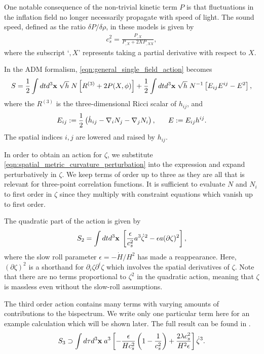 One notable consequence of the non-trivial kinetic term $P$ is that fluctuations in the inflation field no longer necessarily propagate with speed of light. The sound speed, defined as the ratio $\delta P / \delta \rho$, in these models is given by
\begin{align}
	c_s^2 = \frac{P_{,X}}{P_{,X} + 2 X P_{,XX}}, \label{eqn:general_single_field_sound_speed}
\end{align}
where the subscript `$,X$' represents taking a partial derivative with respect to $X$.

In the ADM formalism, \eqref{eqn:general_single_field_action} becomes
\begin{align}
	S = \frac{1}{2}\int dt d^3 \mathbf{x} \; \sqrt{h} \; N \left[ R^{(3)} + 2P(X,\phi) \right] + \frac{1}{2} \int dt d^3 \mathbf{x} \; \sqrt{h} \; N^{-1} \left[ E_{ij} E^{ij} - E^2 \right],
\end{align}
where the $R^{(3)}$ is the three-dimensional Ricci scalar of $h_{ij}$, and
\begin{align}
	E_{ij} := \frac{1}{2} \left( \dot{h}_{ij} - \nabla_i N_j - \nabla_j N_i \right), \hspace{0.05\textwidth}
	E := E_{ij} h^{ij}.
\end{align}
The spatial indices $i,j$ are lowered and raised by $h_{ij}$.

In order to obtain an action for $\zeta$, we substitute \eqref{eqn:spatial_metric_curvature_perturbation} into the expression and expand perturbatively in $\zeta$. We keep terms of order up to three as they are all that is relevant for three-point correlation functions. It is sufficient to evaluate $N$ and $N_i$ to first order in $\zeta$ since they multiply with constraint equations which vanish up to first order.

The quadratic part of the action is given by
\begin{align}
	S_2 = \int dt d^3\mathbf{x} \; \left[ \frac{\epsilon}{c_s^2} a^3 \dot{\zeta}^2 - \epsilon a(\partial\zeta)^2  \right], \label{eqn:quadratic_action_in_zeta}
\end{align}
where the slow roll parameter $\epsilon=-\dot{H}/H^2$ has made a reappearance. Here, $(\partial\zeta)^2$ is a shorthand for $\partial_i \zeta \partial^i \zeta$ which involves the spatial derivatives of $\zeta$. Note that there are no terms proportional to $\zeta^2$ in the quadratic action, meaning that $\zeta$ is massless even without the slow-roll assumptions.

The third order action contains many terms with varying amounts of contributions to the bispectrum. We write only one particular term here for an example calculation which will be shown later. The full result can be found in \cite{Chen2007b}. 
\begin{align}
	S_3 \supset \int d\tau d^3\mathbf{x} \; a^3 \left[ -\frac{\epsilon}{H c_s^2} \left( 1 - \frac{1}{c_s^2} \right) + \frac{2\lambda c_s^2}{H^2 \epsilon} \right] \dot{\zeta}^3.	 \label{eqn:cubic_action_example_term}
\end{align}

